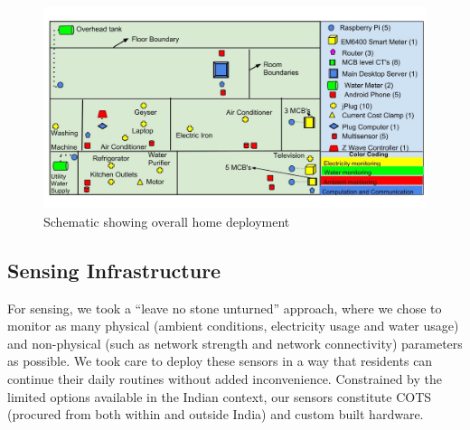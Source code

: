 \documentclass[10pt]{sensys-proc}
\begin{document}
\begin{figure} 
	\vspace{-5mm}    
    \includegraphics[scale=0.19]{./figures/overall_deployment.jpg}
    \vspace{-10mm}    
    \caption{Schematic showing overall home deployment} 
    \vspace{-2mm}  
    \label{fig:overall}
\end{figure}

\subsection{Sensing Infrastructure}
\label{sec:sensing}
For sensing, we took a ``leave no stone unturned'' approach, where  we chose to monitor as many physical (ambient conditions, electricity usage and water usage) and non-physical (such as network strength and network connectivity) parameters as possible. We took care to deploy these sensors in a way that residents can continue their daily routines without added inconvenience. Constrained by the limited options available in the Indian context, our sensors constitute COTS (procured from both within and outside India) and custom built hardware. %
\end{document}
